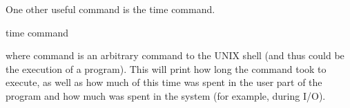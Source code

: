      One other useful command is the {\cmd time} command.
\begin{display}\cmd
time {\ms command\/}
\end{display}
\noindent
     where {\ms command\/} is an  arbitrary command to the UNIX shell
(and thus could be the  execution of  a program). This will print how
long the command took to execute, as  well as  how much  of this time
was spent in the user part of the program and how much was spent in
the system (for example, during I/O).

